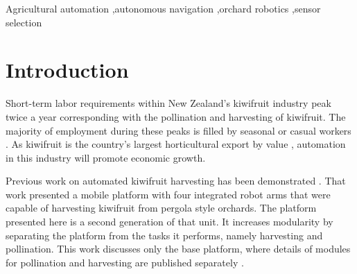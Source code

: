 \documentclass[preprint,authoryear,12pt]{elsarticle}
\begin{document}
\begin{frontmatter}
\begin{keyword}

    Agricultural automation \sep autonomous navigation \sep orchard robotics \sep sensor selection
\end{keyword}

\end{frontmatter}


\section{Introduction}
\label{sect:intro}
    Short-term labor requirements within New Zealand's kiwifruit industry peak twice a year corresponding with the pollination and harvesting of kiwifruit.
    The majority of employment during these peaks is filled by seasonal or casual workers \citep{Timmins2009}.
    As kiwifruit is the country's largest horticultural export by value \citep{StatisticsNewZealand2015}, automation in this industry will promote economic growth.

    Previous work on automated kiwifruit harvesting has been demonstrated \citep{Scarfe2012}.
    That work presented a mobile platform with four integrated robot arms that were capable of harvesting kiwifruit from pergola style orchards.
    The platform presented here is a second generation of that unit.
    It increases modularity by separating the platform from the tasks it performs, namely harvesting and pollination.
    This work discusses only the base platform, where details of modules for pollination and harvesting are published separately \citep{williams2017,Seabright2017}.
\end{document}
